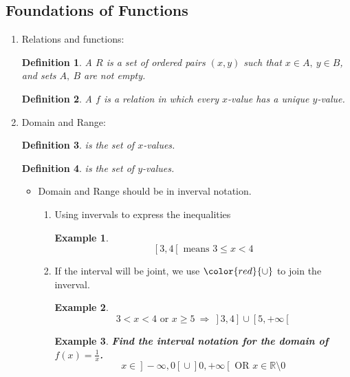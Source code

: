 \documentclass[12pt, a4paper]{article}
\newtheorem{definition}{Definition}[subsection]
\newtheorem{example}{Example}[subsection]
\def\R{{\mathbb{R}}}
\begin{document}
\subsection{Foundations of Functions}
\begin{enumerate}
    \item Relations and functions: 
    \begin{definition}
        A \textbf{\color{red}{relation}} $R$ is a set of ordered pairs $(x,y)$ such that $x\in A,\ y\in B$, and sets $A,\ B$ are not empty. 
    \end{definition}
    \begin{definition}
        A \textbf{\color{red}{function}} $f$ is a relation in which every $x$-value has a unique $y$-value. 
    \end{definition}
    \item Domain and Range: 
    \begin{definition}
        \textbf{\color{red}{Domain}} is the set of $x$-values. 
    \end{definition}
    \begin{definition}
        \textbf{\color{red}{Range}} is the set of $y$-values. 
    \end{definition}
    \begin{itemize}
        \item Domain and Range should be in inverval notation. 
        \begin{enumerate}
            \item Using invervals to express the inequalities
            \begin{example}
                $$\left[\right.3,4\left[\right. \text{ means }3\leq x<4$$
            \end{example}
            \item If the interval will be joint, we use ${\color{red}{\cup}}$ to join the inverval. 
            \begin{example}
                $$3<x<4\text{ or }x\geq 5\ \Rightarrow\ \left.\right]3,4\left.\right]\cup\left[5,+\infty\right.\left[\right.$$
            \end{example}
            \begin{example}
                \textbf{Find the interval notation for the domain of $\displaystyle f(x)=\frac{1}{x}$.}
                $$x\in\left.\right]-\infty,0\left[\right.\cup\left.\right]0,+\infty\left[\right.\text{ OR } x\in\R\setminus 0$$
                {\color{green}{Note: $\setminus$ means "exclude."}}
            \end{example}

\end{enumerate}
\end{itemize}
\end{enumerate}
\end{document}
